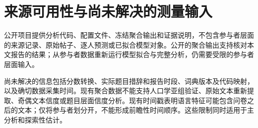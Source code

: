 

\FloatBarrier

\section{来源可用性与尚未解决的测量输入}
公开项目提供分析代码、配置文件、冻结聚合输出和证据说明，不包含参与者层面的来源记录、原始帖子、逐人预测或已拟合模型对象。公开的聚合输出支持核对本文报告的结果；从参与者数据重新运行模型拟合与完整分析，仍需要受限的参与者层面输入。

尚未解决的信息包括分数转换、实际题目措辞和报告时段、词典版本及代码映射，以及确切数据采集时间。现有聚合数据不能支持人口学亚组验证、原始文本重新提取、奇偶文本信度或题目层面信度分析。现有时间戳表明语言特征可能包含问卷之后的文本；仅将参与者划分开，不能形成前瞻性时间顺序。这些限制同时适用于主分析和探索性估计。




